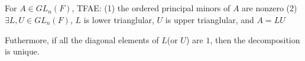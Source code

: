 \subsection{}
\begin{theorem}[LU Decomposition]
    For $A\in GL_n(F)$, TFAE:
    (1) the ordered principal minors of $A$ are nonzero
    (2) $\exists L,U\in GL_n(F)$, $L$ is lower trianglular, $U$ is upper trianglular, and $A=LU$\par
    Futhermore, if all the diagonal elements of $L$(or $U$) are $1$, then the decomposition is unique.
    
\end{theorem}

\begin{theorem}

    
\end{theorem}
